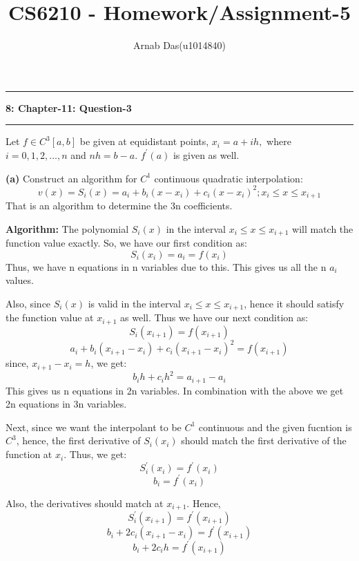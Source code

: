 \documentclass{article}
\title{CS6210 - Homework/Assignment-5}
\author{Arnab Das(u1014840)}
\newcommand\question[2]{\vspace{.25in}\hrule\textbf{#1: #2}\hrule\vspace{.10in}}
\renewcommand\part[1]{\vspace{.10in}\textbf{(#1)}}
\newcommand\algo{\vspace{.10in}\textbf{Algorithm: }}
\begin{document}
  \maketitle
  \newpage
  \newcommand\NAME{ARNAB DAS}
  \newcommand\UID{uxxxxxxx}
  \newcommand\HWNUM{4}



\question{8}{Chapter-11: Question-3}
Let $f \in C^3[a,b]$ be given at equidistant points, $x_i = a + ih,$ where $i=0,1,2, \dots, n$ and $nh = b-a$. $f^\prime(a)$ is given as well. \newline

\part{a} Construct an algorithm for $C^1$ continuous quadratic interpolation: \newline
\[ v(x) = S_i(x) = a_i + b_i(x - x_i) + c_i(x - x_i)^2 ; x_i \leq x \leq x_{i+1}\]
That is an algorithm to determine the 3n coefficients. \newline

\algo
 The polynomial $S_i(x)$ in the interval $x_i \leq x \leq x_{i+1}$ will match the function value exactly. So, we have our first condition as:
	\[S_i(x_i) = a_i = f(x_i) \]
Thus, we have n equations in n variables due to this.
This gives us all the n $a_i$ values. \newline

Also, since $S_i(x)$ is valid in the interval $x_i \leq x \leq x_{i+1}$, hence it should satisfy the function value at $x_{i+1}$ as well. Thus we have our next condition as: 
\[ S_i(x_{i+1}) = f(x_{i+1}) \]
\[ a_i + b_i(x_{i+1} - x_i) + c_i(x_{i+1} - x_i)^2 = f(x_{i+1})\]
since, $x_{i+1} - x_i = h$, we get:
\[ b_i h + c_i h^2 = a_{i+1} - a_i\]
This gives us n equations in 2n variables. In combination with the above we get 2n equations in 3n variables. \newline

Next, since we want the interpolant to be $C^1$ continuous and the given fucntion is $C^3$, hence, the first derivative of $S_i(x_i)$ should match the first derivative of the function at $x_i$. Thus, we get: 
\[ S_{i}^\prime(x_i) = f^\prime(x_i) \]
\[ b_i = f^\prime(x_i)\]

Also, the derivatives should match at $x_{i+1}$. Hence, 
\[ S_i^\prime(x_{i+1}) = f^\prime(x_{i+1})\]
\[ b_i + 2c_i(x_{i+1} - x_i) = f^\prime(x_{i+1})\]
\[ b_i + 2c_i h = f^\prime(x_{i+1})\]
\end{document}
